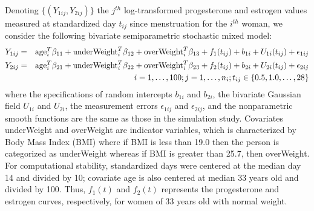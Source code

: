 \documentclass[review]{elsarticle}
\begin{document}
Denoting $\{(Y_{1ij}, Y_{2ij})\}$ the $j^{th}$ log-transformed progesterone and estrogen values measured at standardized day $t_{ij}$ since menstruation for the $i^{th}$ woman, we consider the following bivariate semiparametric stochastic mixed model:
\begin{eqnarray*}
Y_{1ij} &=& {\rm age}_i^T  \beta_{11}  + {\rm underWeight}_i^T  \beta_{12}
+ {\rm overWeight}_i^T  \beta_{13}
+ f_1(t_{ij}) + b_{1i} + U_{1i}(t_{ij}) + \epsilon_{1ij} 
 \\
Y_{2ij} &=& {\rm age}_i^T  \beta_{21} +  {\rm underWeight}_i^T  \beta_{22}
+  {\rm overWeight}_i^T  \beta_{23}
+ f_2(t_{ij}) + b_{2i} + U_{2i}(t_{ij}) + \epsilon_{2ij} 
\\
&& i = 1, \dots, 100; j  = 1, \dots, n_i; t_{ij} \in \{0.5, 1.0, \dots, 28\}
\end{eqnarray*}
where the specifications of random intercepts $b_{1i}$ and $b_{2i}$, the bivariate Gaussian field  $U_{1i}$ and $U_{2i}$, the measurement errors $ \epsilon_{1ij} $ and $ \epsilon_{2ij}$, and the nonparametric smooth functions are the same as those in the simulation study. Covariates underWeight and overWeight are indicator variables, which is characterized by Body Mass Index (BMI)  where if BMI is less than 19.0 then the person is categorized as underWeight whereas if BMI is greater than 25.7, then overWeight. 
For computational stability, standardized days were centered at the median day 14 and divided by 10; covariate age is also centered at median 33 years old and divided by 100. Thus, $f_1(t)$ and $f_2(t)$ represents the progesterone and estrogen curves, respectively, for women of 33 years old with normal weight. 
\end{document}
